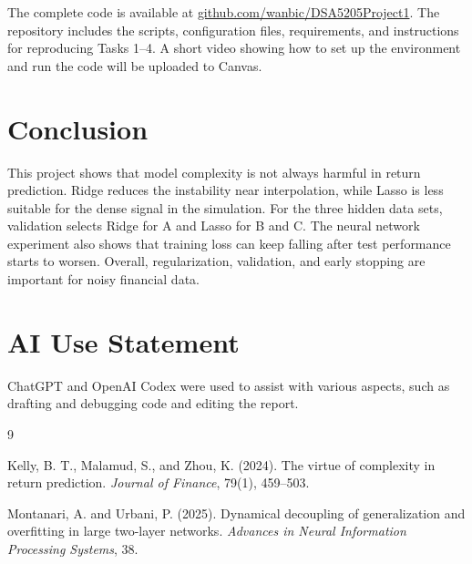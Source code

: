 \documentclass[11pt]{article}
\begin{document}
The complete code is available at
\href{https://github.com/wanbic/DSA5205Project1}{github.com/wanbic/DSA5205Project1}.
The repository includes the scripts, configuration files, requirements, and
instructions for reproducing Tasks 1--4. A short video showing how to set up
the environment and run the code will be uploaded to Canvas.

\section{Conclusion}

This project shows that model complexity is not always harmful in return
prediction. Ridge reduces the instability near interpolation, while Lasso is
less suitable for the dense signal in the simulation. For the three hidden
data sets, validation selects Ridge for A and Lasso for B and C. The neural
network experiment also shows that training loss can keep falling after test
performance starts to worsen. Overall, regularization, validation, and early
stopping are important for noisy financial data.

\section*{AI Use Statement}

ChatGPT and OpenAI Codex were used to assist with various aspects, such as drafting and debugging code and editing the report.

\begin{thebibliography}{9}

Kelly, B. T., Malamud, S., and Zhou, K. (2024).
The virtue of complexity in return prediction.
\emph{Journal of Finance}, 79(1), 459--503.

Montanari, A. and Urbani, P. (2025).
Dynamical decoupling of generalization and overfitting in large two-layer networks.
\emph{Advances in Neural Information Processing Systems}, 38.

\end{thebibliography}
\end{document}
